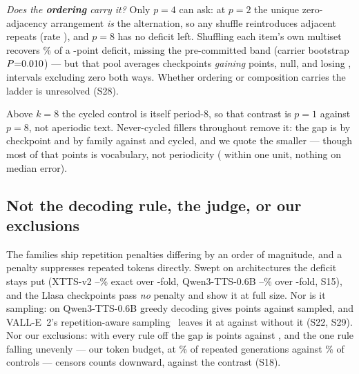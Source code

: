 \emph{Does the \textbf{ordering} carry it?} Only $p\!=\!4$ can ask: at $p\!=\!2$
the unique zero-adjacency arrangement \emph{is} the alternation, so any shuffle
reintroduces adjacent repeats (rate \ShufAdjRate{}), and $p\!=\!8$ has no deficit
left. Shuffling each item's own multiset recovers \ShufRPct{}\% of a
\ShufDeficit{}-point deficit, missing the pre-committed band
(carrier bootstrap $P{=}0.010{}$) --- but that pool averages \ShufNUp{} checkpoints
\emph{gaining} \ShufUpGain{} points, \ShufNNull{} null, and \ShufDownCk{}
losing \ShufDownLoss{}, intervals excluding zero both ways. Whether ordering or
composition carries the ladder is unresolved (S28).

Above $k\!=\!8$ the cycled control is itself period-8, so that contrast is
$p\!=\!1$ against $p\!=\!8$, not aperiodic text. Never-cycled fillers throughout
remove it: the gap is \ApHeadCk{} by checkpoint and
\ApHeadFam{} by family against \ApHeadCkCyc{} and \ApHeadFamCyc{} cycled,
and we quote the smaller --- though most of that \ApHeadDrop{} points is
vocabulary, not periodicity (\ApHeadTolDrop{} within one unit, nothing on
median error).

\subsection{Not the decoding rule, the judge, or our exclusions}

The families ship repetition penalties differing by an order of magnitude, and a
penalty suppresses repeated tokens directly. Swept on \PenNArch{} architectures the deficit
stays put (XTTS-v2
\PenRepLo{}--\PenRepHi{}\% exact over \PenFold{}-fold, Qwen3-TTS-0.6B
\PenQRepLo{}--\PenQRepHi{}\% over \PenQFold{}-fold, S15), and the \PenNoneN{} Llasa checkpoints pass
\emph{no} penalty and show it at full size. Nor is it
sampling: on Qwen3-TTS-0.6B greedy decoding gives \GreedyGap{} points against
\GreedySampGap{} sampled, and VALL-E~2's repetition-aware
sampling~\cite{chen2024valle2} leaves it at \RasOnGap{} against \RasOffGap{}
without it (S22, S29). Nor our exclusions: with every rule off the gap is
\ExSensAll{} points against \ExSensPanel{}, and the one rule falling unevenly ---
our token budget, at \ExclCapRep{}\% of repeated generations against
\ExclCapCtl{}\% of controls --- censors counts downward, against the contrast
(S18).

